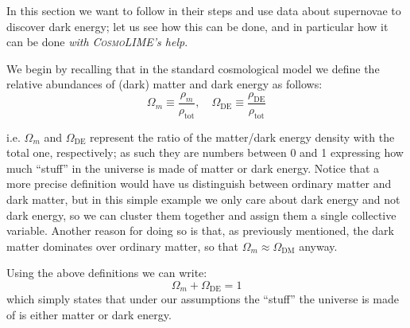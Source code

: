 In this section we want to follow in their steps and use data about supernovae to discover dark energy; let us see how this can be done, and in particular how it can be done \emph{with \textsc{CosmoLIME}'s help}.

We begin by recalling that in the standard cosmological model we define the relative abundances of (dark) matter and dark energy as follows:
\begin{equation*}
    \Omega_m\equiv \frac{\rho_m}{\rho_{\text{tot}}}, \quad \Omega_{\text{DE}} \equiv \frac{\rho_{\text{DE}}}{\rho_{\text{tot}}}
\end{equation*}

i.e. $\Omega_m$ and $\Omega_{\text{DE}}$ represent the ratio of the matter/dark energy density with the total one, respectively; as such they are numbers between 0 and 1 expressing how much ``stuff'' in the universe is made of matter or dark energy.
Notice that a more precise definition would have us distinguish between ordinary matter and dark matter, but in this simple example we only care about dark energy and not dark energy, so we can cluster them together and assign them a single collective variable. Another reason for doing so is that, as previously mentioned, the dark matter dominates over ordinary matter, so that $\Omega_m \approx \Omega_{\text{DM}}$ anyway.

Using the above definitions we can write:
\begin{equation*}
    \Omega_m + \Omega_{\text{DE}} = 1
\end{equation*}
which simply states that under our assumptions the ``stuff'' the universe is made of is either matter or dark energy.

